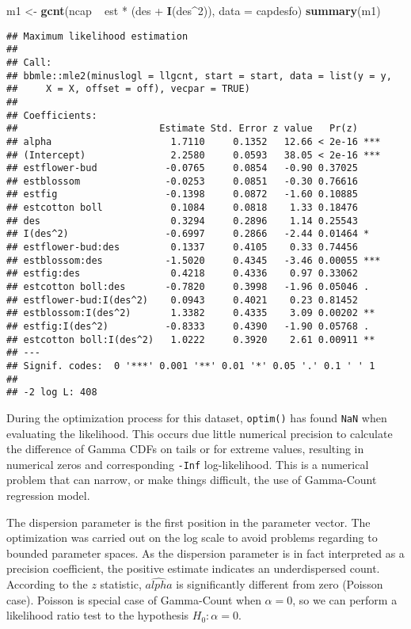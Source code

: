 \documentclass[9pt,a5paper,]{book}
\newenvironment{Shaded}{}{}
\newcommand{\KeywordTok}[1]{\textbf{{#1}}}
\newcommand{\DataTypeTok}[1]{\underline{{#1}}}
\newcommand{\DecValTok}[1]{{#1}}
\newcommand{\StringTok}[1]{{#1}}
\newcommand{\NormalTok}[1]{{#1}}
\renewenvironment{Shaded}{\color{inputcolor}}{}
\renewcommand{\DataTypeTok}[1]{{#1}}
\theoremstyle{definition}
\theoremstyle{definition}
\theoremstyle{remark}
\begin{document}
\begin{Shaded}
\begin{Highlighting}[]
\NormalTok{m1 <-}\StringTok{ }\KeywordTok{gcnt}\NormalTok{(ncap ~}\StringTok{ }\NormalTok{est *}\StringTok{ }\NormalTok{(des +}\StringTok{ }\KeywordTok{I}\NormalTok{(des^}\DecValTok{2}\NormalTok{)),}
           \DataTypeTok{data =} \NormalTok{capdesfo)}
\KeywordTok{summary}\NormalTok{(m1)}
\end{Highlighting}
\end{Shaded}

\begin{verbatim}
## Maximum likelihood estimation
## 
## Call:
## bbmle::mle2(minuslogl = llgcnt, start = start, data = list(y = y, 
##     X = X, offset = off), vecpar = TRUE)
## 
## Coefficients:
##                         Estimate Std. Error z value   Pr(z)    
## alpha                     1.7110     0.1352   12.66 < 2e-16 ***
## (Intercept)               2.2580     0.0593   38.05 < 2e-16 ***
## estflower-bud            -0.0765     0.0854   -0.90 0.37025    
## estblossom               -0.0253     0.0851   -0.30 0.76616    
## estfig                   -0.1398     0.0872   -1.60 0.10885    
## estcotton boll            0.1084     0.0818    1.33 0.18476    
## des                       0.3294     0.2896    1.14 0.25543    
## I(des^2)                 -0.6997     0.2866   -2.44 0.01464 *  
## estflower-bud:des         0.1337     0.4105    0.33 0.74456    
## estblossom:des           -1.5020     0.4345   -3.46 0.00055 ***
## estfig:des                0.4218     0.4336    0.97 0.33062    
## estcotton boll:des       -0.7820     0.3998   -1.96 0.05046 .  
## estflower-bud:I(des^2)    0.0943     0.4021    0.23 0.81452    
## estblossom:I(des^2)       1.3382     0.4335    3.09 0.00202 ** 
## estfig:I(des^2)          -0.8333     0.4390   -1.90 0.05768 .  
## estcotton boll:I(des^2)   1.0222     0.3920    2.61 0.00911 ** 
## ---
## Signif. codes:  0 '***' 0.001 '**' 0.01 '*' 0.05 '.' 0.1 ' ' 1
## 
## -2 log L: 408
\end{verbatim}

During the optimization process for this dataset, \texttt{optim()} has
found \texttt{NaN} when evaluating the likelihood. This occurs due
little numerical precision to calculate the difference of Gamma CDFs on
tails or for extreme values, resulting in numerical zeros and
corresponding \texttt{-Inf} log-likelihood. This is a numerical problem
that can narrow, or make things difficult, the use of Gamma-Count
regression model.

The dispersion parameter is the first position in the parameter vector.
The optimization was carried out on the log scale to avoid problems
regarding to bounded parameter spaces. As the dispersion parameter is in
fact interpreted as a precision coefficient, the positive estimate
indicates an underdispersed count. According to the \(z\) statistic,
\(\hat{alpha}\) is significantly different from zero (Poisson case).
Poisson is special case of Gamma-Count when \(\alpha = 0\), so we can
perform a likelihood ratio test to the hypothesis \(H_0: \alpha = 0\).
\end{document}
